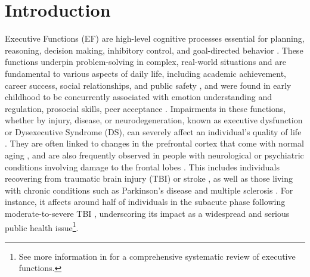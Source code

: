 \begin{chapterabstract}
\begin{enumerate}

    \end{enumerate}
\end{chapterabstract}


\section{Introduction}
\label{sec:chapter_4_introduction}

Executive Functions (EF) are high-level cognitive processes essential for planning, reasoning, decision making, inhibitory control, and goal-directed behavior \cite{Cristofori2019, Diamond2013}. These functions underpin problem-solving in complex, real-world situations and are fundamental to various aspects of daily life, including academic achievement, career success, social relationships, and public safety \cite{Robertson1997}, and were found in early childhood to be concurrently associated with emotion understanding and regulation, prosocial skills, peer acceptance \cite{Stucke2024}. Impairments in these functions, whether by injury, disease, or neurodegeneration, known as executive dysfunction or Dysexecutive Syndrome (DS), can severely affect an individual’s quality of life \cite{PabloRos2024, Rabinovici2015}. 
They are often linked to changes in the prefrontal cortex that come with normal aging \cite{Raz1999, Burke2006}, and are also frequently observed in people with neurological or psychiatric conditions involving damage to the frontal lobes \cite{Godefroy2003}. This includes individuals recovering from traumatic brain injury (TBI) or stroke \cite{Baddeley1988, Tsai2021}, as well as those living with chronic conditions such as Parkinson’s disease \cite{Aarsland2005} and multiple sclerosis \cite{Hajric2023}. For instance, it affects around half of individuals in the subacute phase following moderate-to-severe TBI \cite{Ribeiro2023}, underscoring its impact as a widespread and serious public health issue\footnote{See more information in  \cite{Borgnis2022} for a comprehensive systematic review of executive functions.}.




